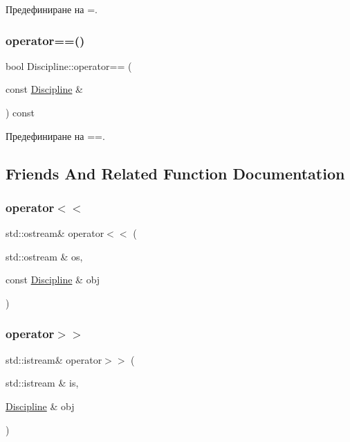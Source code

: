 Предефиниране на =. 

\mbox{\label{class_discipline_a44dbd9000f68f726aeed2bfcab64daf9}} 
\subsubsection{\texorpdfstring{operator==()}{operator==()}}
{\footnotesize\ttfamily bool Discipline\+::operator== (\begin{DoxyParamCaption}\item[{const \hyperlink{class_discipline}{Discipline} \&}]{ }\end{DoxyParamCaption}) const}



Предефиниране на ==. 



\subsection{Friends And Related Function Documentation}
\mbox{\label{class_discipline_a70a18bd0fe28be947317cf0e06e58942}} 
\subsubsection{\texorpdfstring{operator$<$$<$}{operator<<}}
{\footnotesize\ttfamily std\+::ostream\& operator$<$$<$ (\begin{DoxyParamCaption}\item[{std\+::ostream \&}]{os,  }\item[{const \hyperlink{class_discipline}{Discipline} \&}]{obj }\end{DoxyParamCaption})\hspace{0.3cm}{\ttfamily [friend]}}

\mbox{\label{class_discipline_a8ef3bb5be1ffee2afd412602b0cdc57b}} 
\subsubsection{\texorpdfstring{operator$>$$>$}{operator>>}}
{\footnotesize\ttfamily std\+::istream\& operator$>$$>$ (\begin{DoxyParamCaption}\item[{std\+::istream \&}]{is,  }\item[{\hyperlink{class_discipline}{Discipline} \&}]{obj }\end{DoxyParamCaption})\hspace{0.3cm}{\ttfamily [friend]}}



